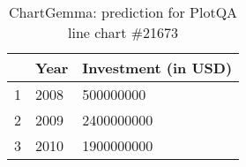 \begin{table}
\begin{tabular}{lll}
\toprule
 & Year  & Investment (in USD)  \\
\midrule
1 & 2008  & 500000000  \\
2 & 2009  & 2400000000  \\
3 & 2010  & 1900000000  \\
\bottomrule
\end{tabular}
    \caption{ChartGemma: prediction for PlotQA line chart \#21673}
    \label{tab:chartgemma-plotqa-line-21673}
\end{table}
